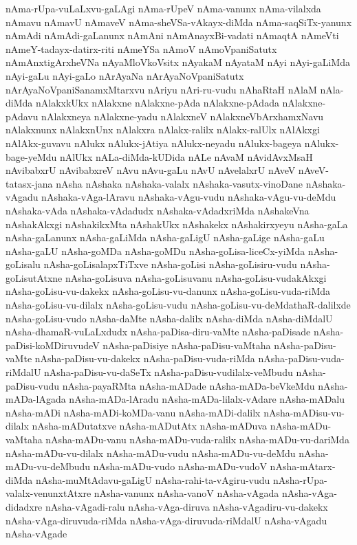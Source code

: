 {nAma-rUpa-vuLaLxvu-gaLAgi
nAma-rUpeV
nAma-vanunx
nAma-vilalxda
nAmavu
nAmavU
nAmaveV
nAma-sheVSa-vAkayx-diMda
nAma-saqSiTx-yanunx
nAmAdi
nAmAdi-gaLanunx
nAmAni
nAmAnayxBi-vadati
nAmaqtA
nAmeVti
nAmeY-tadayx-datirx-riti
nAmeYSa
nAmoV
nAmoVpaniSatutx
nAmAnxtigArxheVNa
nAyaMloVkoVsitx
nAyakaM
nAyataM
nAyi
nAyi-gaLiMda
nAyi-gaLu
nAyi-gaLo
nArAyaNa
nArAyaNoVpaniSatutx
nArAyaNoVpaniSanamxMtarxvu
nAriyu
nAri-ru-vudu
nAhaRtaH
nAlaM
nAla-diMda
nAlakxkUkx
nAlakxne
nAlakxne-pAda
nAlakxne-pAdada
nAlakxne-pAdavu
nAlakxneya
nAlakxne-yadu
nAlakxneV
nAlakxneVbArxhamxNavu
nAlakxnunx
nAlakxnUnx
nAlakxra
nAlakx-ralilx
nAlakx-ralUlx
nAlAkxgi
nAlAkx-guvavu
nAlukx
nAlukx-jAtiya
nAlukx-neyadu
nAlukx-bageya
nAlukx-bage-yeMdu
nAlUkx
nALa-diMda-kUDida
nALe
nAvaM
nAvidAvxMsaH
nAvibabxrU
nAvibabxreV
nAvu
nAvu-gaLu
nAvU
nAvelalxrU
nAveV
nAveV-tatasx-jana
nAsha
nAshaka
nAshaka-valalx
nAshaka-vasutx-vinoDane
nAshaka-vAgadu
nAshaka-vAga-lAravu
nAshaka-vAgu-vudu
nAshaka-vAgu-vu-deMdu
nAshaka-vAda
nAshaka-vAdadudx
nAshaka-vAdadxriMda
nAshakeVna
nAshakAkxgi
nAshakikxMta
nAshakUkx
nAshakekx
nAshakirxyeyu
nAsha-gaLa
nAsha-gaLanunx
nAsha-gaLiMda
nAsha-gaLigU
nAsha-gaLige
nAsha-gaLu
nAsha-gaLU
nAsha-goMDa
nAsha-goMDu
nAsha-goLisa-liceCx-yiMda
nAsha-goLisalu
nAsha-goLisalapxTiTxve
nAsha-goLisi
nAsha-goLisiru-vudu
nAsha-goLisutAtxne
nAsha-goLisuva
nAsha-goLisuvanu
nAsha-goLisu-vudakAkxgi
nAsha-goLisu-vu-dakekx
nAsha-goLisu-vu-danunx
nAsha-goLisu-vuda-riMda
nAsha-goLisu-vu-dilalx
nAsha-goLisu-vudu
nAsha-goLisu-vu-deMdathaR-dalilxde
nAsha-goLisu-vudo
nAsha-daMte
nAsha-dalilx
nAsha-diMda
nAsha-diMdalU
nAsha-dhamaR-vuLaLxdudx
nAsha-paDisa-diru-vaMte
nAsha-paDisade
nAsha-paDisi-koMDiruvudeV
nAsha-paDisiye
nAsha-paDisu-vaMtaha
nAsha-paDisu-vaMte
nAsha-paDisu-vu-dakekx
nAsha-paDisu-vuda-riMda
nAsha-paDisu-vuda-riMdalU
nAsha-paDisu-vu-daSeTx
nAsha-paDisu-vudilalx-veMbudu
nAsha-paDisu-vudu
nAsha-payaRMta
nAsha-mADade
nAsha-mADa-beVkeMdu
nAsha-mADa-lAgada
nAsha-mADa-lAradu
nAsha-mADa-lilalx-vAdare
nAsha-mADalu
nAsha-mADi
nAsha-mADi-koMDa-vanu
nAsha-mADi-dalilx
nAsha-mADisu-vu-dilalx
nAsha-mADutatxve
nAsha-mADutAtx
nAsha-mADuva
nAsha-mADu-vaMtaha
nAsha-mADu-vanu
nAsha-mADu-vuda-ralilx
nAsha-mADu-vu-dariMda
nAsha-mADu-vu-dilalx
nAsha-mADu-vudu
nAsha-mADu-vu-deMdu
nAsha-mADu-vu-deMbudu
nAsha-mADu-vudo
nAsha-mADu-vudoV
nAsha-mAtarx-diMda
nAsha-muMtAdavu-gaLigU
nAsha-rahi-ta-vAgiru-vudu
nAsha-rUpa-valalx-venunxtAtxre
nAsha-vanunx
nAsha-vanoV
nAsha-vAgada
nAsha-vAga-didadxre
nAsha-vAgadi-ralu
nAsha-vAga-diruva
nAsha-vAgadiru-vu-dakekx
nAsha-vAga-diruvuda-riMda
nAsha-vAga-diruvuda-riMdalU
nAsha-vAgadu
nAsha-vAgade
}
